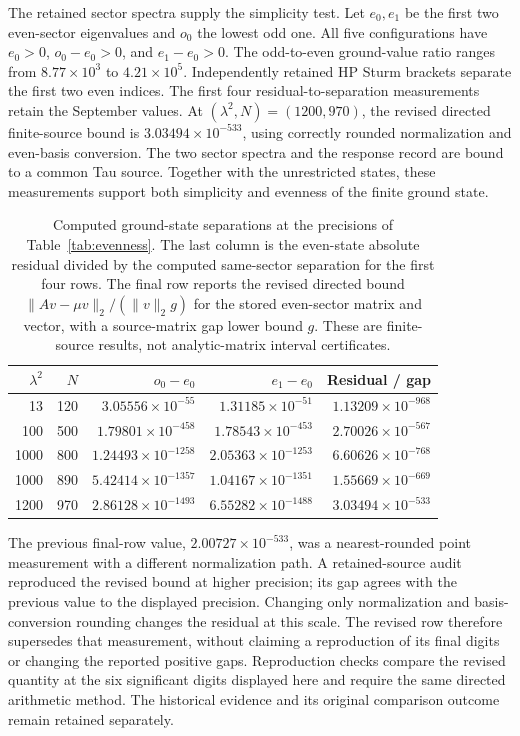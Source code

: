 \documentclass[11pt,a4paper]{article}
\begin{document}
The retained sector spectra supply the simplicity test. Let $e_0,e_1$
be the first two even-sector eigenvalues and $o_0$ the lowest odd one.
All five configurations have $e_0>0$, $o_0-e_0>0$, and $e_1-e_0>0$.
The odd-to-even ground-value ratio ranges from $8.77\times10^3$ to
$4.21\times10^5$. Independently retained HP Sturm brackets separate
the first two even indices. The first four residual-to-separation
measurements retain the September values. At $(\lambda^2,N)=(1200,970)$,
the revised directed finite-source bound is $3.03494\times10^{-533}$,
using correctly rounded normalization and even-basis conversion.
The two sector spectra and the response record are bound to a common
Tau source. Together with the unrestricted states, these measurements
support both simplicity and evenness of the finite ground state.

\begin{table}[!htbp]
\centering
\small
\caption{Computed ground-state separations at the precisions of
Table~\ref{tab:evenness}. The last column is the even-state absolute
residual divided by the computed same-sector separation for the first four
rows. The final row reports the revised directed bound
$\|Av-\mu v\|_2/(\|v\|_2 g)$ for the stored even-sector matrix and vector,
with a source-matrix gap lower bound $g$.
These are finite-source results, not analytic-matrix interval certificates.}
\label{tab:sector_separations}
\begin{tabular}{@{}rrrrr@{}}
\toprule
$\lambda^2$ & $N$ & $o_0-e_0$ & $e_1-e_0$ & Residual / gap \\
\midrule
13 & 120 & $3.05556\times10^{-55}$ & $1.31185\times10^{-51}$ & $1.13209\times10^{-968}$ \\
100 & 500 & $1.79801\times10^{-458}$ & $1.78543\times10^{-453}$ & $2.70026\times10^{-567}$ \\
1000 & 800 & $1.24493\times10^{-1258}$ & $2.05363\times10^{-1253}$ & $6.60626\times10^{-768}$ \\
1000 & 890 & $5.42414\times10^{-1357}$ & $1.04167\times10^{-1351}$ & $1.55669\times10^{-669}$ \\
1200 & 970 & $2.86128\times10^{-1493}$ & $6.55282\times10^{-1488}$ & $3.03494\times10^{-533}$ \\
\bottomrule
\end{tabular}
\end{table}

The previous final-row value, $2.00727\times10^{-533}$, was a
nearest-rounded point measurement with a different normalization path.
A retained-source audit reproduced the revised bound at higher precision;
its gap agrees with the previous value to the displayed precision.
Changing only normalization and basis-conversion rounding changes the
residual at this scale. The revised row therefore supersedes that measurement,
without claiming a reproduction of its final digits or changing the
reported positive gaps. Reproduction checks compare the revised quantity
at the six significant digits displayed here and require the same directed
arithmetic method. The historical evidence and its original comparison
outcome remain retained separately.
\end{document}
